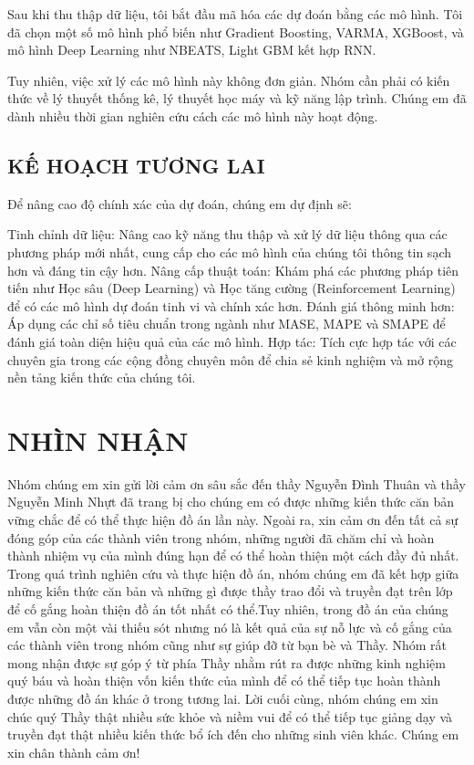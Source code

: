 \documentclass[conference]{IEEEtran}
\begin{document}
Sau khi thu thập dữ liệu, tôi bắt đầu mã hóa các dự đoán bằng các mô hình. Tôi đã chọn một số mô hình phổ biến như Gradient Boosting, VARMA, XGBoost, và mô hình Deep Learning như NBEATS,  Light GBM kết hợp RNN. 

Tuy nhiên, việc xử lý các mô hình này không đơn giản. Nhóm cần phải có kiến thức về lý thuyết thống kê, lý thuyết học máy và kỹ năng lập trình. Chúng em đã dành nhiều thời gian nghiên cứu cách các mô hình này hoạt động.

\subsection{KẾ HOẠCH TƯƠNG LAI }

Để nâng cao độ chính xác của dự đoán, chúng em dự định sẽ:

Tinh chỉnh dữ liệu: Nâng cao kỹ năng thu thập và xử lý dữ liệu thông qua các phương pháp mới nhất, cung cấp cho các mô hình của chúng tôi thông tin sạch hơn và đáng tin cậy hơn.
Nâng cấp thuật toán: Khám phá các phương pháp tiên tiến như Học sâu (Deep Learning) và Học tăng cường (Reinforcement Learning) để có các mô hình dự đoán tinh vi và chính xác hơn.
Đánh giá thông minh hơn: Áp dụng các chỉ số tiêu chuẩn trong ngành như MASE, MAPE và SMAPE để đánh giá toàn diện hiệu quả của các mô hình.
Hợp tác: Tích cực hợp tác với các chuyên gia trong các cộng đồng chuyên môn để chia sẻ kinh nghiệm và mở rộng nền tảng kiến thức của chúng tôi.

\section*{NHÌN NHẬN  }

Nhóm chúng em xin gửi lời cảm ơn sâu sắc đến thầy Nguyễn Đình Thuân và thầy Nguyễn Minh Nhựt đã trang bị cho chúng em có được những kiến thức căn bản vững chắc để có thể thực hiện đồ án lần này. Ngoài ra, xin cảm ơn đến tất cả sự đóng góp của các thành viên trong nhóm, những người đã chăm chỉ và hoàn thành nhiệm vụ của mình đúng hạn để có thể hoàn thiện một cách đầy đủ nhất. 
Trong quá trình nghiên cứu và thực hiện đồ án, nhóm chúng em đã kết hợp giữa những kiến thức căn bản và những gì được thầy trao đổi và truyền đạt trên lớp để cố gắng hoàn thiện đồ án tốt nhất có thể.Tuy nhiên, trong đồ án của chúng em vẫn còn một vài thiếu sót nhưng nó là kết quả của sự nỗ lực và cố gắng của các thành viên trong nhóm cũng như sự giúp đỡ từ bạn bè và Thầy. Nhóm rất mong nhận được sự góp ý từ phía Thầy nhằm rút ra được những kinh nghiệm quý báu và hoàn thiện vốn kiến thức của mình để có thể tiếp tục hoàn thành được những đồ án khác ở trong tương lai. 
Lời cuối cùng, nhóm chúng em xin chúc quý Thầy thật nhiều sức khỏe và niềm vui để có thể tiếp tục giảng dạy và truyền đạt thật nhiều kiến thức bổ ích đến cho những sinh viên khác. Chúng em xin chân thành cảm ơn! 
\end{document}
